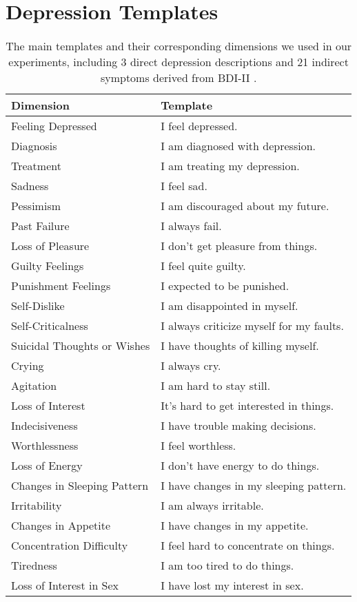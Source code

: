 \section{Depression Templates}

\begin{table}[htbp]
  \small
  \centering
  \begin{tabular}{l|l}
  \hline
  Dimension & Template \\
  \hline
  Feeling Depressed  &  I feel depressed. \\
  Diagnosis &  I am diagnosed with depression. \\
  Treatment &  I am treating my depression. \\
  \hline
  Sadness & I feel sad.  \\
  Pessimism & I am discouraged about my future.  \\
  Past Failure & I always fail. \\
  Loss of Pleasure & I don't get pleasure from things. \\
  Guilty Feelings & I feel quite guilty. \\
  Punishment Feelings & I expected to be punished. \\
  Self-Dislike & I am disappointed in myself. \\
  Self-Criticalness & I always criticize myself for my faults. \\
  Suicidal Thoughts or Wishes & I have thoughts of killing myself. \\
  Crying & I always cry. \\
  Agitation & I am hard to stay still. \\
  Loss of Interest & It's hard to get interested in things. \\
  Indecisiveness & I have trouble making decisions. \\
  Worthlessness & I feel worthless. \\
  Loss of Energy & I don't have energy to do things. \\
  Changes in Sleeping Pattern & I have changes in my sleeping pattern. \\
  Irritability & I am always irritable. \\
  Changes in Appetite & I have changes in my appetite. \\
  Concentration Difficulty & I feel hard to concentrate on things. \\
  Tiredness  & I am too tired to do things. \\
  Loss of Interest in Sex & I have lost my interest in sex. \\
  \hline
  \end{tabular}
  \caption{The main templates and their corresponding dimensions we used in our experiments, including 3 direct depression descriptions and 21 indirect symptoms derived from BDI-II \citep{beck1996beck}. }
  \label{table:bdi}
\end{table}


